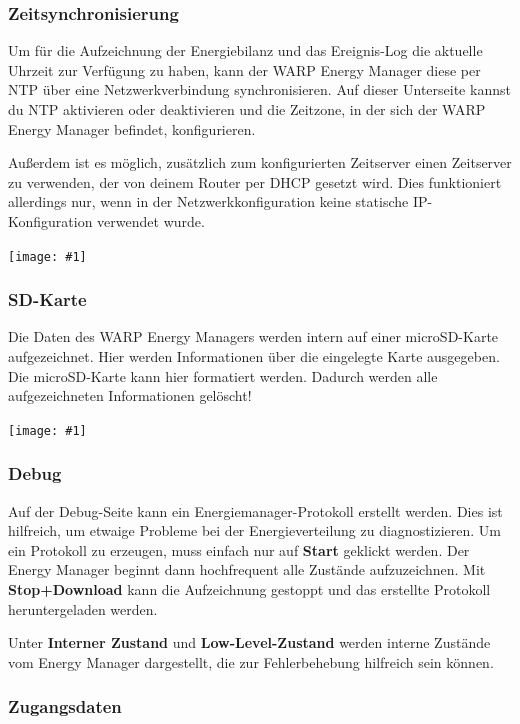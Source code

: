 \documentclass[a4paper,10pt]{article}
\newcommand{\gfx}[1]{\texttt{[image: \#1]}}
\begin{document}
\begin{multicols*}{2}
	\subsubsection{Zeitsynchronisierung}\label{ntp}
	Um für die Aufzeichnung der Energiebilanz und das Ereignis-Log die aktuelle Uhrzeit zur
	Verfügung zu haben, kann der WARP Energy Manager diese per NTP über
	eine Netzwerkverbindung synchronisieren. Auf dieser Unterseite kannst du NTP aktivieren oder deaktivieren und die Zeitzone, in der sich der WARP Energy Manager befindet, konfigurieren.

	Außerdem ist es möglich, zusätzlich zum konfigurierten Zeitserver einen Zeitserver zu verwenden, der von deinem Router per DHCP gesetzt wird. Dies funktioniert allerdings nur,
	wenn in der Netzwerkkonfiguration keine statische IP-Konfiguration verwendet wurde.

	\gfx{./img/resized/web_ntp}

	\subsubsection{SD-Karte}
	Die Daten des WARP Energy Managers werden intern auf einer microSD-Karte
	aufgezeichnet. Hier werden Informationen über die eingelegte Karte ausgegeben. Die microSD-Karte kann
	hier formatiert werden. Dadurch werden alle aufgezeichneten Informationen gelöscht!

	\gfx{./img/resized/web_em_sdcard}

	\subsubsection{Debug}
	Auf der Debug-Seite kann ein Energiemanager-Protokoll erstellt werden. Dies
	ist hilfreich, um etwaige Probleme bei der Energieverteilung zu diagnostizieren. Um
	ein Protokoll zu erzeugen, muss einfach nur auf \textbf{Start} geklickt
	werden. Der Energy Manager beginnt dann hochfrequent alle Zustände
	aufzuzeichnen. Mit \textbf{Stop+Download} kann die Aufzeichnung gestoppt und
	das erstellte Protokoll heruntergeladen werden.

	Unter \textbf{Interner Zustand} und \textbf{Low-Level-Zustand} werden interne Zustände vom Energy Manager
	dargestellt, die zur Fehlerbehebung hilfreich sein können.

	\subsubsection{Zugangsdaten}


\end{multicols*}
\end{document}
